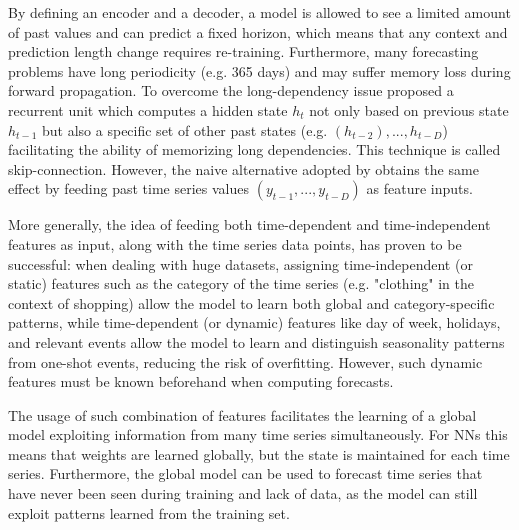\documentclass[a4paper]{article} %
\begin{document}
	By defining an encoder and a decoder, a model is allowed to see a limited amount of past values and can predict a fixed horizon, which means that any context and prediction length change requires re-training. Furthermore, many forecasting problems have long periodicity (e.g. 365 days) and may suffer memory loss during forward propagation. To overcome the long-dependency issue \cite{NARX} proposed a recurrent unit which computes a hidden state $h_t$ not only based on previous state $h_{t-1}$ but also a specific set of other past states (e.g. $(h_{t-2}), ..., h_{t-D}$) facilitating the ability of memorizing long dependencies. This technique is called skip-connection. However, the naive alternative adopted by \cite{DeepAR, MQCNN} obtains the same effect by feeding past time series values $(y_{t-1}, ..., y_{t-D})$ as feature inputs.
	
	More generally, the idea of feeding both time-dependent and time-independent features as input, along with the time series data points, has proven to be successful: when dealing with huge datasets, assigning time-independent (or static) features such as the category of the time series (e.g. "clothing" in the context of shopping) allow the model to learn both global and category-specific patterns, while time-dependent (or dynamic) features like day of week, holidays, and relevant events allow the model to learn and distinguish seasonality patterns from one-shot events, reducing the risk of overfitting. However, such dynamic features must be known beforehand when computing forecasts.
	
	The usage of such combination of features facilitates the learning of a global model exploiting information from many time series simultaneously. For NNs this means that weights are learned globally, but the state is maintained for each time series. Furthermore, the global model can be used to forecast time series that have never been seen during training and lack of data, as the model can still exploit patterns learned from the training set.
	
	
	
	
	 
	
	
\end{document}
